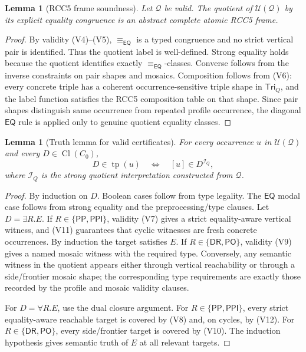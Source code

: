 \documentclass[11pt]{article}
\newtheorem{lemma}[theorem]{Lemma}
\newcommand{\Cl}{\operatorname{Cl}}
\newcommand{\EQ}{\mathsf{EQ}}
\newcommand{\PP}{\mathsf{PP}}
\newcommand{\PPI}{\mathsf{PPI}}
\newcommand{\PO}{\mathsf{PO}}
\newcommand{\DR}{\mathsf{DR}}
\newcommand{\I}{\mathcal I}
\newcommand{\Q}{\mathcal Q}
\newcommand{\U}{\mathcal U}
\newcommand{\typ}{\operatorname{tp}}
\newcommand{\eqc}{\equiv_{\EQ}}
\newcommand{\Tri}{\mathsf{Tri}}
\begin{document}
\begin{lemma}[RCC5 frame soundness]\label{lem:frame-sound}
Let \(\Q\) be valid.  The quotient of \(\U(\Q)\) by its explicit equality congruence is an abstract complete atomic RCC5 frame.
\end{lemma}

\begin{proof}
By validity (V4)--(V5), \(\eqc\) is a typed congruence and no strict vertical pair is identified.  Thus the quotient label is well-defined.  Strong equality holds because the quotient identifies exactly \(\eqc\)-classes.  Converse follows from the inverse constraints on pair shapes and mosaics.  Composition follows from (V6): every concrete triple has a coherent occurrence-sensitive triple shape in \(\Tri_Q\), and the label function satisfies the RCC5 composition table on that shape.  Since pair shapes distinguish same occurrence from repeated profile occurrence, the diagonal \(\EQ\) rule is applied only to genuine quotient equality classes.
\end{proof}

\begin{lemma}[Truth lemma for valid certificates]\label{lem:truth}
For every occurrence \(u\) in \(\U(\Q)\) and every \(D\in\Cl(C_0)\),
\[
  D\in\typ(u) \quad\Longleftrightarrow\quad [u]\in D^{\I_Q},
\]
where \(\I_Q\) is the strong quotient interpretation constructed from \(\Q\).
\end{lemma}

\begin{proof}
By induction on \(D\).  Boolean cases follow from type legality.  The \(\EQ\) modal case follows from strong equality and the preprocessing/type clauses.  Let \(D=\exists R.E\).  If \(R\in\{\PP,\PPI\}\), validity (V7) gives a strict equality-aware vertical witness, and (V11) guarantees that cyclic witnesses are fresh concrete occurrences.  By induction the target satisfies \(E\).  If \(R\in\{\DR,\PO\}\), validity (V9) gives a named mosaic witness with the required type.  Conversely, any semantic witness in the quotient appears either through vertical reachability or through a side/frontier mosaic shape; the corresponding type requirements are exactly those recorded by the profile and mosaic validity clauses.

For \(D=\forall R.E\), use the dual closure argument.  For \(R\in\{\PP,\PPI\}\), every strict equality-aware reachable target is covered by (V8) and, on cycles, by (V12).  For \(R\in\{\DR,\PO\}\), every side/frontier target is covered by (V10).  The induction hypothesis gives semantic truth of \(E\) at all relevant targets.
\end{proof}
\end{document}
